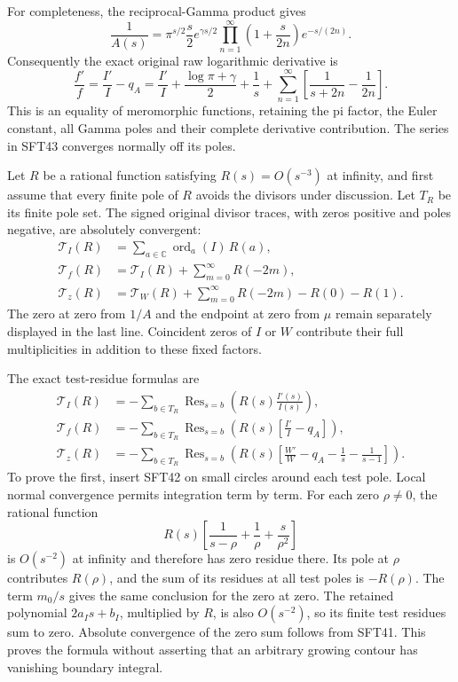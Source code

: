 \documentclass[
  10pt,
  a4paper,
]{article}
\begin{document}
For completeness, the reciprocal-Gamma product gives \[
 \frac1{A(s)}
   =\pi^{s/2}\frac{s}{2}e^{\gamma s/2}
       \prod_{n=1}^{\infty}
           \left(1+\frac{s}{2n}\right)e^{-s/(2n)}.
\] Consequently the exact original raw logarithmic derivative is \[
 \boxed{\displaystyle
 \frac{f'}f
  =\frac{I'}I-q_A
  =\frac{I'}I+\frac{\log\pi+\gamma}{2}+\frac1s+
       \sum_{n=1}^{\infty}
          \left[\frac1{s+2n}-\frac1{2n}\right].}
 \tag{SFT43}
\] This is an equality of meromorphic functions, retaining the pi
factor, the Euler constant, all Gamma poles and their complete
derivative contribution. The series in SFT43 converges normally off its
poles.

Let \(R\) be a rational function satisfying \(R(s)=O(s^{-3})\) at
infinity, and first assume that every finite pole of \(R\) avoids the
divisors under discussion. Let \(T_R\) be its finite pole set. The
signed original divisor traces, with zeros positive and poles negative,
are absolutely convergent: \[
 \begin{aligned}
 \mathscr T_I(R)&=\sum_{a\in\mathbb C}
                      \operatorname{ord}_a(I)\,R(a),\\
 \mathscr T_f(R)&=\mathscr T_I(R)
                          +\sum_{m=0}^{\infty}R(-2m),\\
 \mathscr T_z(R)&=\mathscr T_W(R)
                          +\sum_{m=0}^{\infty}R(-2m)-R(0)-R(1).
 \end{aligned}
 \tag{SFT44}
\] The zero at zero from \(1/A\) and the endpoint at zero from \(\mu\)
remain separately displayed in the last line. Coincident zeros of \(I\)
or \(W\) contribute their full multiplicities in addition to these fixed
factors.

The exact test-residue formulas are \[
 \boxed{\begin{aligned}
 \mathscr T_I(R)&=-\sum_{b\in T_R}
                    \operatorname{Res}_{s=b}
                          \left(R(s)\frac{I'(s)}{I(s)}\right),\\
 \mathscr T_f(R)&=-\sum_{b\in T_R}
                    \operatorname{Res}_{s=b}
                          \left(R(s)\left[\frac{I'}I-q_A\right]\right),\\
 \mathscr T_z(R)&=-\sum_{b\in T_R}
                    \operatorname{Res}_{s=b}
                    \left(R(s)\left[\frac{W'}W-q_A
                                    -\frac1s-\frac1{s-1}\right]\right).
 \end{aligned}}
 \tag{SFT45}
\] To prove the first, insert SFT42 on small circles around each test
pole. Local normal convergence permits integration term by term. For
each zero \(\rho\ne0\), the rational function \[
 R(s)\left[\frac1{s-\rho}+\frac1\rho+\frac{s}{\rho^2}\right]
\] is \(O(s^{-2})\) at infinity and therefore has zero residue there.
Its pole at \(\rho\) contributes \(R(\rho)\), and the sum of its
residues at all test poles is \(-R(\rho)\). The term \(m_0/s\) gives the
same conclusion for the zero at zero. The retained polynomial
\(2a_Is+b_I\), multiplied by \(R\), is also \(O(s^{-2})\), so its finite
test residues sum to zero. Absolute convergence of the zero sum follows
from SFT41. This proves the formula without asserting that an arbitrary
growing contour has vanishing boundary integral.
\end{document}
